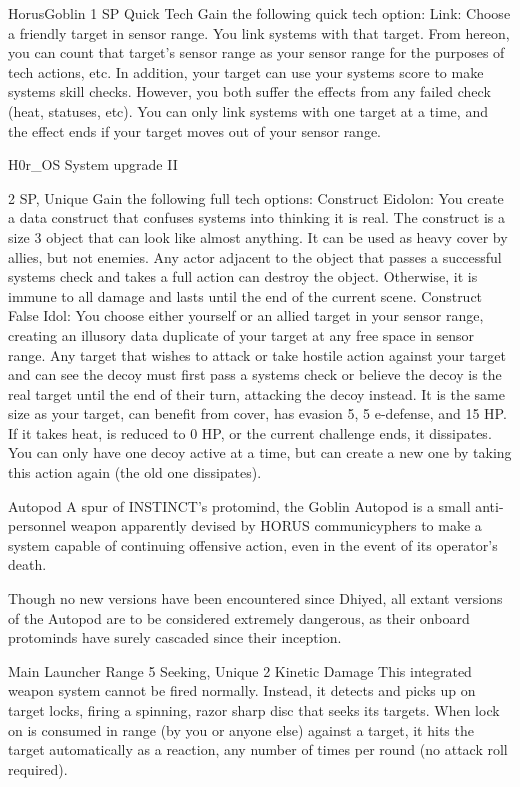 \begin{mech}{Horus}{Goblin}
1 SP
Quick Tech
Gain the following quick tech option:
Link: Choose a friendly target in sensor range. You link systems with that target. From hereon, you can count that target’s sensor range as your sensor range for the purposes of tech actions, etc. In addition, your target can use your systems score to make systems skill checks. However, you both suffer the effects from any failed check (heat, statuses, etc). You can only link systems with one target at a time, and the effect ends if your target moves out of your sensor range.

H0r\_OS System upgrade II 

2 SP, Unique
Gain the following full tech options:
Construct Eidolon: You create a data construct that confuses systems into thinking it is real. The construct is a size 3 object that can look like almost anything. It can be used as heavy cover by allies, but not enemies. Any actor adjacent to the object that passes a successful systems check and takes a full action can destroy the object. Otherwise, it is immune to all damage and lasts until the end of the current scene.
Construct False Idol: You choose either yourself or an allied target in your sensor range, creating an illusory data duplicate of your target at any free space in sensor range. Any target that wishes to attack or take hostile action against your target and can see the decoy must first pass a systems check or believe the decoy is the real target until the end of their turn, attacking the decoy instead. It is the same size as your target, can benefit from cover, has evasion 5, 5 e-defense, and 15 HP. If it takes heat, is reduced to 0 HP, or the current challenge ends, it dissipates. You can only have one decoy active at a time, but can create a new one by taking this action again (the old one dissipates).

Autopod
A spur of INSTINCT’s protomind, the Goblin Autopod is a small anti-personnel weapon apparently devised by HORUS communicyphers to make a system capable of continuing offensive action, even in the event of its operator’s death. 

Though no new versions have been encountered since Dhiyed, all extant versions of the Autopod are to be considered extremely dangerous, as their onboard protominds have surely cascaded since their inception.

Main Launcher
Range 5
Seeking, Unique
2 Kinetic Damage
This integrated weapon system cannot be fired normally. Instead, it detects and picks up on target locks, firing a spinning, razor sharp disc that seeks its targets. When lock on is consumed in range (by you or anyone else) against a target, it hits the target automatically as a reaction, any number of times per round (no attack roll required).


\end{mech}

